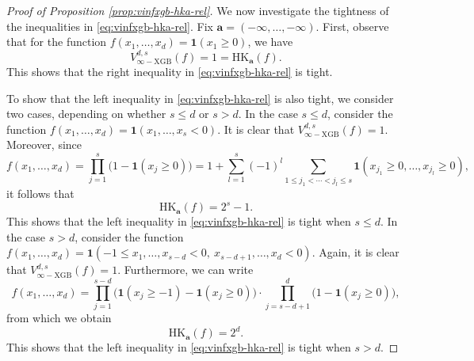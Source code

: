 \documentclass[10pt]{article}
\newcommand{\vinfxgb}{{V^{d, s}_{\infty-\text{XGB}}}}
\newcommand{\hk}{{\text{HK}}}
\newcommand{\abf}{{\mathbf{a}}}
\newcommand{\ind}{{\mathbf{1}}}
\begin{document}
\begin{proof}[Proof of Proposition \ref{prop:vinfxgb-hka-rel}]
We now investigate the tightness of the inequalities in 
\eqref{eq:vinfxgb-hka-rel}. Fix $\abf = (-\infty, \dots, -\infty)$.
First, observe that for the function 
$f(x_1, \dots, x_d) = \ind(x_1 \ge 0)$, we have
\begin{equation*}
    \vinfxgb(f) = 1 = \hk_{\abf}(f).
\end{equation*}
This shows that the right inequality in \eqref{eq:vinfxgb-hka-rel} 
is tight. 

To show that the left inequality in \eqref{eq:vinfxgb-hka-rel} is 
also tight, we consider two cases, depending on whether $s \le d$ 
or $s > d$. In the case $s \le d$, consider the function 
$f(x_1, \dots, x_d) = \ind(x_1, \dots, x_s < 0)$. It is clear that 
$\vinfxgb(f) = 1$. Moreover, since
\begin{equation*}
    f(x_1, \dots, x_d) = \prod_{j = 1}^{s} \big(1 - \ind(x_j \ge 0)\big)
    = 1 + \sum_{l = 1}^{s} (-1)^{l}
    \sum_{1 \le j_1 < \cdots < j_l \le s} 
    \ind(x_{j_1} \ge 0, \dots, x_{j_l} \ge 0),
\end{equation*}
it follows that
\begin{equation*}
    \hk_{\abf}(f) = 2^s - 1.
\end{equation*}
This shows that the left inequality in \eqref{eq:vinfxgb-hka-rel} 
is tight when $s \le d$. In the case $s > d$, consider the function 
$f(x_1, \dots, x_d) = \ind(-1 \le x_1, \dots, x_{s - d} < 0, \ 
x_{s - d + 1}, \dots, x_d < 0)$. Again, it is clear that 
$\vinfxgb(f) = 1$. Furthermore, we can write
\begin{equation*}
    f(x_1, \dots, x_d) 
    = \prod_{j = 1}^{s - d} \big(\ind(x_j \ge -1) - \ind(x_j \ge 0)\big)
    \cdot \prod_{j = s - d + 1}^{d} \big(1 - \ind(x_j \ge 0)\big),
\end{equation*}
from which we obtain
\begin{equation*}
    \hk_{\abf}(f) = 2^d.
\end{equation*}
This shows that the left inequality in \eqref{eq:vinfxgb-hka-rel} 
is tight when $s > d$.
\end{proof}
\end{document}
